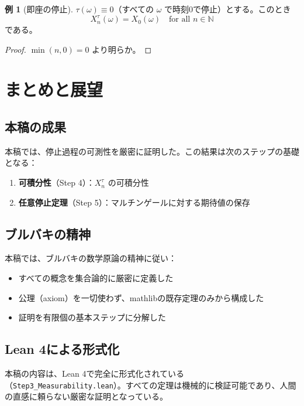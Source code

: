 \documentclass[a4paper,12pt]{ltjsarticle}
\theoremstyle{definition}
\newtheorem{example}[theorem]{例}
\newcommand{\N}{\mathbb{N}}
\begin{document}
\begin{example}[即座の停止]
$\tau(\omega) \equiv 0$（すべての $\omega$ で時刻0で停止）とする。このとき
\[
X^\tau_n(\omega) = X_0(\omega) \quad \text{for all } n \in \N
\]
である。
\end{example}

\begin{proof}
$\min(n, 0) = 0$ より明らか。
\end{proof}

\section{まとめと展望}

\subsection{本稿の成果}

本稿では、停止過程の可測性を厳密に証明した。この結果は次のステップの基礎となる：

\begin{enumerate}
\item \textbf{可積分性}（Step 4）：$X^\tau_n$ の可積分性
\item \textbf{任意停止定理}（Step 5）：マルチンゲールに対する期待値の保存
\end{enumerate}

\subsection{ブルバキの精神}

本稿では、ブルバキの数学原論の精神に従い：

\begin{itemize}
\item すべての概念を集合論的に厳密に定義した
\item 公理（axiom）を一切使わず、mathlibの既存定理のみから構成した
\item 証明を有限個の基本ステップに分解した
\end{itemize}

\subsection{Lean 4による形式化}

本稿の内容は、Lean 4で完全に形式化されている（\texttt{Step3\_Measurability.lean}）。すべての定理は機械的に検証可能であり、人間の直感に頼らない厳密な証明となっている。
\end{document}
